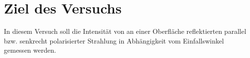 \section{Ziel des Versuchs}
\label{sec:Versuchsziel}
In diesem Versuch soll die Intensität von an einer Oberfläche reflektierten parallel bzw. senkrecht polarisierter Strahlung in Abhängigkeit vom Einfallswinkel gemessen werden.

